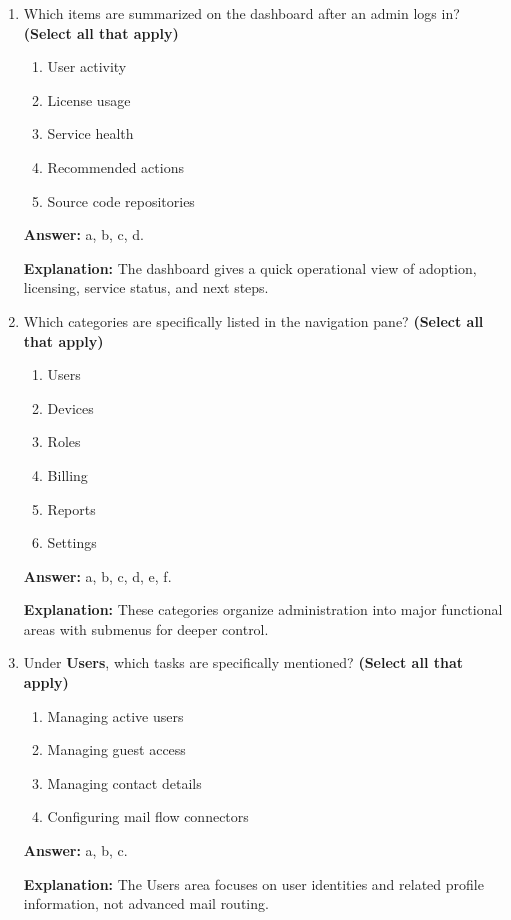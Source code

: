 \documentclass[10pt]{article}
\begin{document}
\begin{enumerate}[leftmargin=*]
\textbf{Explanation:} The interface is role-aware, so each administrator sees capabilities aligned to their responsibilities.

\item Which items are summarized on the dashboard after an admin logs in? \textbf{(Select all that apply)}
\begin{enumerate}[label=\alph*., leftmargin=1.5em]
\item User activity
\item License usage
\item Service health
\item Recommended actions
\item Source code repositories
\end{enumerate}
\textbf{Answer:} a, b, c, d.

\textbf{Explanation:} The dashboard gives a quick operational view of adoption, licensing, service status, and next steps.

\item Which categories are specifically listed in the navigation pane? \textbf{(Select all that apply)}
\begin{enumerate}[label=\alph*., leftmargin=1.5em]
\item Users
\item Devices
\item Roles
\item Billing
\item Reports
\item Settings
\end{enumerate}
\textbf{Answer:} a, b, c, d, e, f.

\textbf{Explanation:} These categories organize administration into major functional areas with submenus for deeper control.

\item Under \textbf{Users}, which tasks are specifically mentioned? \textbf{(Select all that apply)}
\begin{enumerate}[label=\alph*., leftmargin=1.5em]
\item Managing active users
\item Managing guest access
\item Managing contact details
\item Configuring mail flow connectors
\end{enumerate}
\textbf{Answer:} a, b, c.

\textbf{Explanation:} The Users area focuses on user identities and related profile information, not advanced mail routing.


\end{enumerate}
\end{document}
